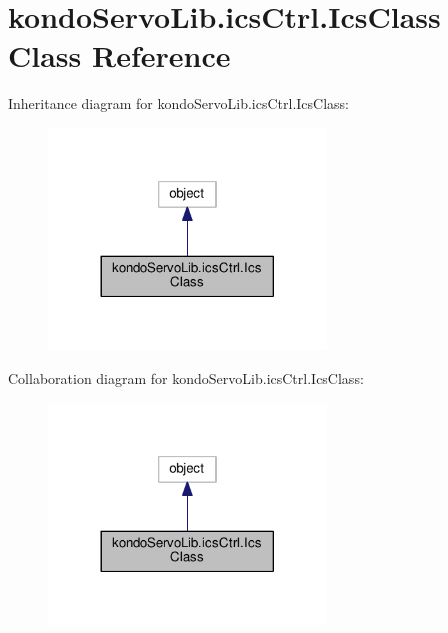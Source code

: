 \hypertarget{classkondoServoLib_1_1icsCtrl_1_1IcsClass}{}\section{kondo\+Servo\+Lib.\+ics\+Ctrl.\+Ics\+Class Class Reference}
\label{classkondoServoLib_1_1icsCtrl_1_1IcsClass}


Inheritance diagram for kondo\+Servo\+Lib.\+ics\+Ctrl.\+Ics\+Class\+:\nopagebreak
\begin{figure}[H]
\begin{center}
\leavevmode
\includegraphics[width=209pt]{classkondoServoLib_1_1icsCtrl_1_1IcsClass__inherit__graph}
\end{center}
\end{figure}


Collaboration diagram for kondo\+Servo\+Lib.\+ics\+Ctrl.\+Ics\+Class\+:\nopagebreak
\begin{figure}[H]
\begin{center}
\leavevmode
\includegraphics[width=209pt]{classkondoServoLib_1_1icsCtrl_1_1IcsClass__coll__graph}
\end{center}
\end{figure}
